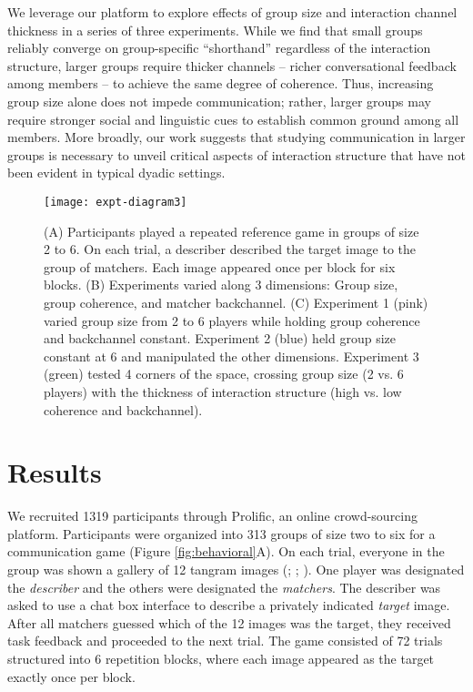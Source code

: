 \documentclass[
  english,
]{article}
\begin{document}
We leverage our platform to explore effects of group size and interaction channel thickness in a series of three experiments.
While we find that small groups reliably converge on group-specific ``shorthand'' regardless of the interaction structure, larger groups require thicker channels -- richer conversational feedback among members -- to achieve the same degree of coherence.
Thus, increasing group size alone does not impede communication; rather, larger groups may require stronger social and linguistic cues to establish common ground among all members.
More broadly, our work suggests that studying communication in larger groups is necessary to unveil critical aspects of interaction structure that have not been evident in typical dyadic settings.

\begin{figure*}[t!]

{\centering \texttt{[image: expt-diagram3]} 

}

\caption{(A) Participants played a repeated reference game in groups of size 2 to 6. On each trial, a describer described the target image to the group of matchers. Each image appeared once per block for six blocks. (B) Experiments varied along 3 dimensions: Group size, group coherence, and matcher backchannel. (C) Experiment 1 (pink) varied group size from 2 to 6 players while holding group coherence and backchannel constant. Experiment 2 (blue) held group size constant at 6 and manipulated the other dimensions. Experiment 3 (green) tested 4 corners of the space, crossing group size (2 vs. 6 players) with the thickness of interaction structure (high vs. low coherence and backchannel).}\label{fig:diagram}
\end{figure*}

\section{Results}\label{results}

We recruited 1319 participants through Prolific, an online crowd-sourcing platform.
Participants were organized into 313 groups of size two to six for a communication game (Figure \ref{fig:behavioral}A).
On each trial, everyone in the group was shown a gallery of 12 tangram images (; ; ).
One player was designated the \emph{describer} and the others were designated the \emph{matchers}.
The describer was asked to use a chat box interface to describe a privately indicated \emph{target} image.
After all matchers guessed which of the 12 images was the target, they received task feedback and proceeded to the next trial.
The game consisted of 72 trials structured into 6 repetition blocks, where each image appeared as the target exactly once per block.
\end{document}

